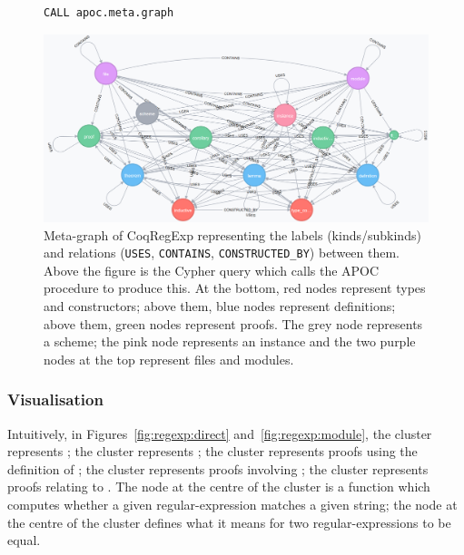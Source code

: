 \begin{table}[tp]
  
\end{table}

\begin{table}[tp]
  
\end{table}

\begin{figure}[tp]
\begin{verbatim}
CALL apoc.meta.graph
\end{verbatim}
\centering
\includegraphics[width=\textwidth]{img/regexp/meta.png}
\caption{Meta-graph of CoqRegExp representing the labels (kinds/subkinds) and
  relations (\texttt{USES}, \texttt{CONTAINS}, \texttt{CONSTRUCTED\_BY})
  between them. Above the figure is the Cypher query which calls the APOC
  procedure to produce this. At the bottom, red nodes represent types and
  constructors; above them, blue nodes represent definitions; above them, green
  nodes represent proofs. The grey node represents a scheme; the pink node
  represents an instance and the two purple nodes at the top represent files
  and modules.}\label{fig:regexp:meta}
\end{figure}

\subsubsection{Visualisation}\label{subsubsec:visualisation}

Intuitively, in Figures~\ref{fig:regexp:direct} and~\ref{fig:regexp:module},
the  cluster represents ; the  cluster represents ; the  cluster represents proofs using the
definition of ; the  cluster
represents proofs involving ; the  cluster represents proofs relating
to . The node at the centre of the  cluster is a function which computes whether a given regular-expression
matches a given string; the node at the centre of the  cluster
defines what it means for two regular-expressions to be equal.

